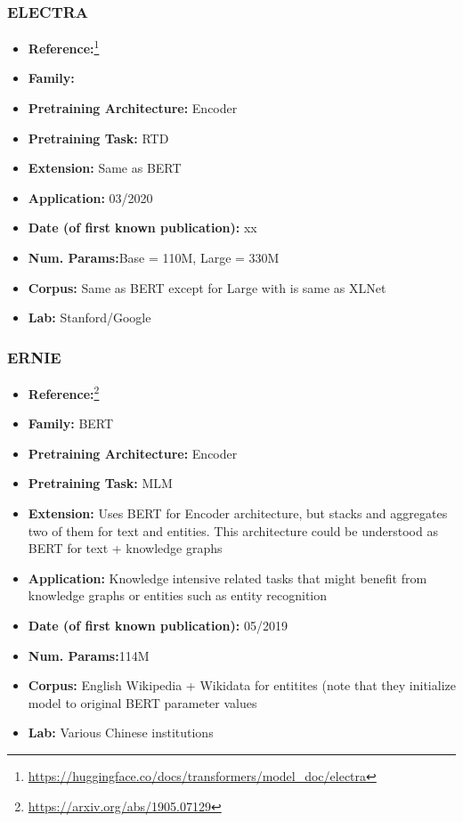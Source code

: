 \documentclass{article}
\begin{document}
\subsubsection{ELECTRA}

            \begin{itemize}
                \item \textbf{Reference:}\footnote{\url{https://huggingface.co/docs/transformers/model_doc/electra}}\cite{clark2020electra}
                \item \textbf{Family:} 
                \item \textbf{Pretraining Architecture:} Encoder
                \item \textbf{Pretraining Task:} RTD
                \item \textbf{Extension:} Same as BERT  
                \item \textbf{Application:} 03/2020
                \item \textbf{Date (of first known publication):} xx
                \item \textbf{Num. Params:}Base = 110M, Large = 330M
                \item \textbf{Corpus:} Same as BERT except for Large with is same as XLNet
                \item \textbf{Lab:} Stanford/Google
            \end{itemize}

\subsubsection{ERNIE}

            \begin{itemize}
                \item \textbf{Reference:}\footnote{\url{https://arxiv.org/abs/1905.07129}}\cite{zhang2019ernie}
                \item \textbf{Family:} BERT 
                \item \textbf{Pretraining Architecture:} Encoder
                \item \textbf{Pretraining Task:} MLM
                \item \textbf{Extension:} Uses BERT for Encoder architecture, but stacks and aggregates two of them for text and entities. This architecture could be understood as BERT for text + knowledge graphs  
                \item \textbf{Application:} Knowledge intensive related tasks that might benefit from knowledge graphs or entities such as entity recognition
                \item \textbf{Date (of first known publication):} 05/2019
                \item \textbf{Num. Params:}114M
                \item \textbf{Corpus:} English Wikipedia + Wikidata for entitites (note that they initialize model to original BERT parameter values
                \item \textbf{Lab:} Various Chinese institutions
            \end{itemize} 
\end{document}

